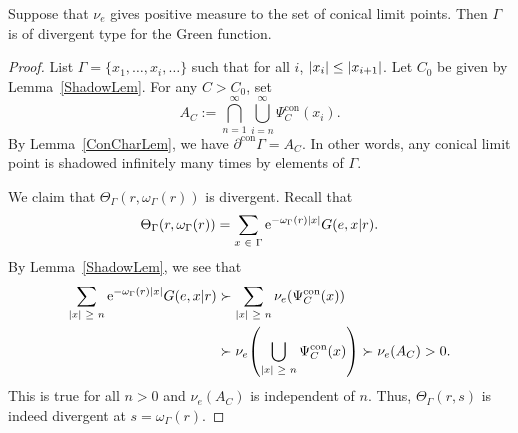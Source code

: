 \documentclass[AHL,Unicode,longabstracts]{cedram}
\newcommand{\rme}{\mathrm{e}}
\DeclareMathOperator{\con}{con}
\let\originalleft\left
\let\originalright\right
\renewcommand{\left}{\mathopen{}\mathclose\bgroup\originalleft}
\renewcommand{\right}{\aftergroup\egroup\originalright}
\let\oldin\in
\renewcommand{\in}{\mathchoice{\oldin}{\oldin}{\,\oldin\,}{\,\oldin\,}}
\let\oldge\ge
\renewcommand{\ge}{\mathchoice{\oldge}{\oldge}{\,\oldge\,}{\,\oldge\,}}
\let\oldle\le
\renewcommand{\le}{\mathchoice{\oldle}{\oldle}{\,\oldle\,}{\,\oldle\,}}
\begin{document}
\begin{prop}\label{PosMeasonConcialProp}
Suppose that $\nu_e$ gives positive measure to the set of conical limit points. Then $\Gamma$ is of divergent type for the Green function.
\end{prop}
\begin{proof}
List $\Gamma = \{x_1, \dotso, x_i, \dots\}$ such that for all $i$, $|x_i|\le | x_{i+1}|$. Let $C_0$ be given by Lemma~\ref{ShadowLem}. For any $C>C_0$, set
\begin{equation}\label{conicalset}
A_{C} := \bigcap_{n=1}^{\infty} \bigcup_{i=n}^{\infty}
\Psi_{C}^{\con}(x_i).
\end{equation}
By Lemma~\ref{ConCharLem}, we have $\partial^{\con}\Gamma =A_{C}$. In other words, any conical limit point is shadowed infinitely many times by elements of $\Gamma$.

We claim that $\Theta_{\Gamma}(r,\omega_\Gamma(r))$ is divergent. Recall that
\[
\Theta_{\Gamma}(r,\omega_\Gamma(r)) = \sum\limits_{x \in \Gamma} \rme^{-\omega_\Gamma(r)|x|}G(e,x|r).
\]
By Lemma~\ref{ShadowLem}, we see that
\begin{align*}
\sum_{|x|\ge n} \rme^{-\omega_\Gamma(r)|x|}G(e,x|r) & \succ \sum_{|x|\ge n} \nu_e(\Psi^{\con}_{C}(x)) \\
&\succ \nu_e\left(\bigcup_{|x|\ge n} \Psi^{\con}_C(x)\right) \succ \nu_e(A_{C}) > 0.
\end{align*}
This is true for all $n > 0$ and $\nu_e(A_{C})$ is independent of $n$. Thus, $\Theta_{\Gamma}(r,s)$ is indeed divergent at $s=\omega_\Gamma(r)$.
\end{proof}
\end{document}
